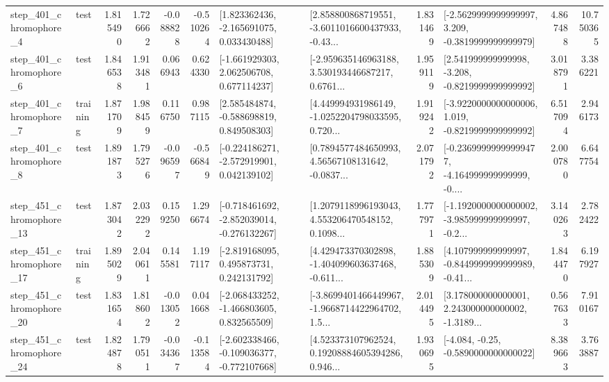 \begin{tabular}{llrrrrllrlrr}
   step\_401\_chromophore\_4 &      test &      1.815490 &    1.726662 &     -0.088828 & -0.510264 &    [1.823362436, -2.165691075, 0.033430488] &  [2.858800868719551, -3.6011016600437933, -0.43... &       1.831469 &  [-2.5629999999999997, 3.209, -0.3819999999999979] &            4.867488 &         10.750365 \\
   step\_401\_chromophore\_6 &      test &      1.846538 &    1.913481 &      0.066943 &  0.624330 &    [-1.661929303, 2.062506708, 0.677114237] &  [-2.959635146963188, 3.530193446687217, 0.6761... &       1.959119 &   [2.541999999999998, -3.208, -0.8219999999999992] &            3.018791 &          3.386221 \\
   step\_401\_chromophore\_7 &  training &      1.871709 &    1.988459 &      0.116750 &  0.987115 &    [2.585484874, -0.588698819, 0.849508303] &  [4.449994931986149, -1.0252204798033595, 0.720... &       1.919242 &  [-3.9220000000000006, 1.019, -0.8219999999999992] &            6.517094 &          2.946173 \\
   step\_401\_chromophore\_8 &      test &      1.891873 &    1.795276 &     -0.096597 & -0.566849 &   [-0.224186271, -2.572919901, 0.042139102] &  [0.7894577484650993, 4.56567108131642, -0.0837... &       2.071792 &  [-0.23699999999999477, -4.164999999999999, -0.... &            2.000780 &          6.647754 \\
  step\_451\_chromophore\_13 &      test &      1.873042 &    2.032292 &      0.159250 &  1.296674 &  [-0.718461692, -2.852039014, -0.276132267] &  [1.2079118996193043, 4.553206470548152, 0.1098... &       1.777971 &  [-1.1920000000000002, -3.985999999999997, -0.2... &            3.140263 &          2.782422 \\
  step\_451\_chromophore\_17 &  training &      1.895029 &    2.040611 &      0.145581 &  1.197117 &    [-2.819168095, 0.495873731, 0.242131792] &  [4.429473370302898, -1.404099603637468, -0.611... &       1.885309 &  [4.107999999999997, -0.8449999999999989, -0.41... &            1.844470 &          6.197927 \\
  step\_451\_chromophore\_20 &      test &      1.831654 &    1.818602 &     -0.013052 &  0.041668 &   [-2.068433252, -1.466803605, 0.832565509] &  [-3.8699401466449967, -1.9668714422964702, 1.5... &       2.014495 &  [3.178000000000001, 2.243000000000002, -1.3189... &            0.567633 &          7.910167 \\
  step\_451\_chromophore\_24 &      test &      1.824878 &    1.790511 &     -0.034367 & -0.113584 &  [-2.602338466, -0.109036377, -0.772107668] &  [4.523373107962524, 0.19208884605394286, 0.946... &       1.930695 &               [-4.084, -0.25, -0.5890000000000022] &            8.389663 &          3.763887 \\

\end{tabular}
